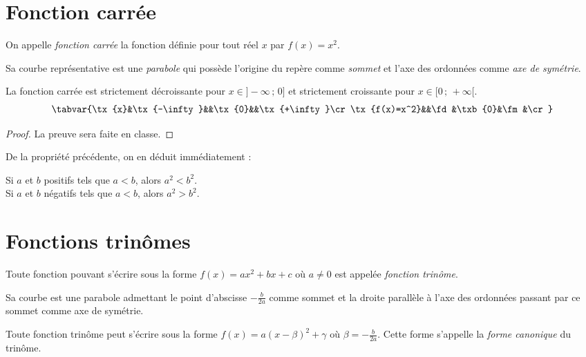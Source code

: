 \section{Fonction carr\'ee}

\begin{definition}
 On appelle \emph{fonction carr\'ee} la fonction d\'efinie pour tout r\'eel $x$ par $f(x)=x^2$.\\
\end{definition}

Sa courbe repr\'esentative est une \emph{parabole} qui poss\`ede l'origine du rep\`ere comme \emph{sommet} et l'axe des ordonn\'ees comme \emph{axe de sym\'etrie}.

\begin{prop}
 La fonction carr\'ee est strictement d\'ecroissante pour $x\in]-\infty\,;\,0]$ et strictement croissante pour $x\in[0\,;\,+\infty[$.
\[\tabvar{%
\tx{x}&\tx{-\infty}&&\tx{0}&&\tx{+\infty}\cr
\tx{f(x)=x^2}&&\fd&\txb{0}&\fm&\cr
}\]
\end{prop}

\begin{proof}
 La preuve sera faite en classe.
\end{proof}

De la propri\'et\'e pr\'ec\'edente, on en d\'eduit imm\'ediatement :
\begin{prop}
 Si $a$ et $b$ positifs tels que $a<b$, alors $a^2<b^2$.\\
 Si $a$ et $b$ n\'egatifs tels que $a<b$, alors $a^2>b^2$.
\end{prop}

\section{Fonctions trin\^omes}

\begin{definition}
 Toute fonction pouvant s'\'ecrire sous la forme $f(x)=ax^2+bx+c$ o\`u $a\neq0$ est appel\'ee \emph{fonction trin\^ome}.
\end{definition}

Sa courbe est une parabole admettant le point d'abscisse $-\frac{b}{2a}$ comme sommet et la droite parall\`ele \`a l'axe des ordonn\'ees passant par ce sommet comme axe de sym\'etrie.

\begin{prop}
 Toute fonction trin\^ome peut s'\'ecrire sous la forme $f(x)=a(x-\beta)^2+\gamma$ o\`u $\beta=-\frac{b}{2a}$. Cette forme s'appelle la \emph{forme canonique} du trin\^ome.
\end{prop}

